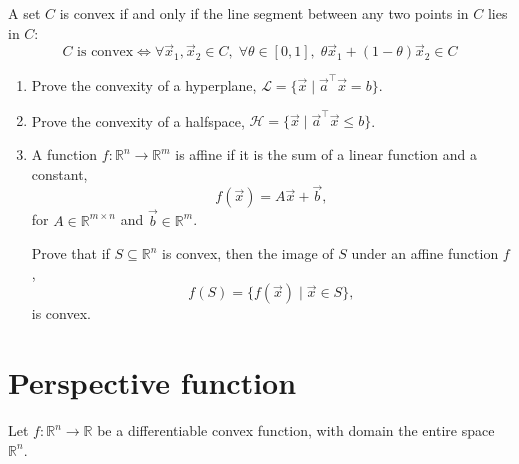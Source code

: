 \documentclass[10pt]{article}
\theoremstyle{definition}
\theoremstyle{plain}
\newcommand{\RR}{\mathbb{R}}
\begin{document}
A set $C$ is convex if and only if the line segment between any two points in $C$ lies in $C$:
\begin{equation}
    C \text{ is convex} \iff \forall \vec{x}_1, \vec{x}_2 \in C, \; \forall \theta \in [0,1], \; \theta \vec{x}_1 + (1-\theta)\vec{x}_2 \in C
\end{equation}

\begin{enumerate}[label=(\alph*), resume]
    \item Prove the convexity of a hyperplane, $\mathcal{L} = \{\vec{x} \mid \vec{a}^\top \vec{x} = b\}$.

    \item Prove the convexity of a halfspace, $\mathcal{H} = \{\vec{x} \mid \vec{a}^\top \vec{x} \le b\}$.

    \item A function $f : \RR^n \to \RR^m$ is affine if it is the sum of a linear function and a constant,
    \begin{equation}
        f(\vec{x}) = A\vec{x} + \vec{b},
    \end{equation}
    for $A \in \RR^{m \times n}$ and $\vec{b} \in \RR^m$.

    Prove that if $S \subseteq \RR^n$ is convex, then the image of $S$ under an affine function $f$,
    \begin{equation}
        f(S) = \{f(\vec{x}) \mid \vec{x} \in S\},
    \end{equation}
    is convex.
\end{enumerate}

\section{Perspective function}

Let $f : \RR^n \to \RR$ be a differentiable convex function, with domain the entire space $\RR^n$.
\end{document}

